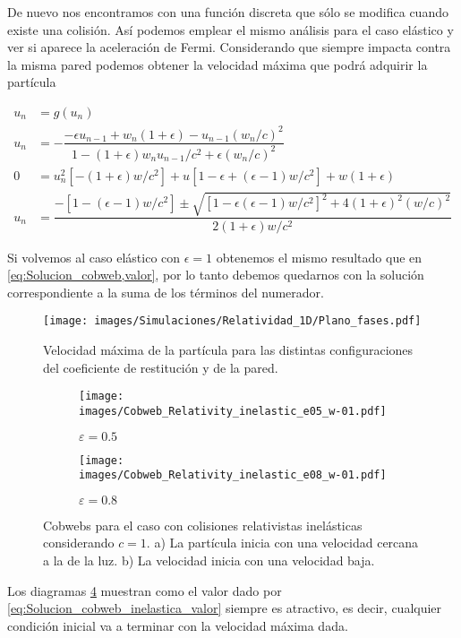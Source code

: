 \documentclass[11pt, spanish]{book}
\begin{document}
De nuevo nos encontramos con una función discreta que sólo se modifica cuando existe una colisión. Así podemos emplear el mismo análisis para el caso elástico y ver si aparece la aceleración de Fermi. Considerando que siempre impacta contra la misma pared podemos obtener la velocidad máxima que podrá adquirir la partícula

\begin{align}\label{eq:Solucion_cobweb_inelastica}
    u_n &= g(u_n) \nonumber\\
    u_n &= -\dfrac{-\epsilon u_{n-1} + w_n(1+\epsilon) -  u_{n-1}(w_n/c)^2}{1 - (1+\epsilon)w_n u_{n-1}/c^2 + \epsilon(w_n/c)^2} \\
    0 &= u_n^2\left[ -(1+\epsilon)w/c^2 \right] + u\left[ 1 - \epsilon + (\epsilon - 1)w/c^2 \right] + w(1+\epsilon) \nonumber\\
    u_n &= \dfrac{-\left[ 1 -  (\epsilon - 1)w/c^2 \right] \pm \sqrt{\left[ 1 - \epsilon (\epsilon - 1)w/c^2 \right]^2 + 4(1+\epsilon)^2(w/c)^2}}{2(1+\epsilon)w/c^2} \label{eq:Solucion_cobweb_inelastica_valor}
\end{align}

Si volvemos al caso elástico con \( \epsilon = 1 \) obtenemos el mismo resultado que en \ref{eq:Solucion_cobweb,valor}, por lo tanto debemos quedarnos con la solución correspondiente a la suma de los términos del numerador. 

\begin{figure}[H]
    \centering
    \texttt{[image: images/Simulaciones/Relatividad\_1D/Plano\_fases.pdf]}
    \caption{Velocidad máxima de la partícula para las distintas configuraciones del coeficiente de restitución y de la pared.}
    \label{fig:plano_fases_coef_wall}
\end{figure}

\begin{figure}[H]
    \centering
    \begin{subfigure}[b]{0.49\textwidth}
        \centering
        \texttt{[image: images/Cobweb\_Relativity\_inelastic\_e05\_w-01.pdf]}
        \caption{$\varepsilon = 0.5$}
        \label{fig:Cobweb_inelastics_A}
    \end{subfigure}
    \hfill
    \begin{subfigure}[b]{0.49\textwidth}
        \centering
        \texttt{[image: images/Cobweb\_Relativity\_inelastic\_e08\_w-01.pdf]}
        \caption{$\varepsilon = 0.8$}
        \label{fig:Cobweb_inelastics_B}
    \end{subfigure}
    \caption{Cobwebs para el caso con colisiones relativistas inelásticas considerando $c=1$. a) La partícula inicia con una velocidad cercana a la de la luz. b) La velocidad inicia con una velocidad baja. }
        \label{fig:Cobweb_inelastics}
\end{figure}

Los diagramas \ref{fig:Cobweb_inelastics} muestran como el valor dado por \ref{eq:Solucion_cobweb_inelastica_valor} siempre es atractivo, es decir, cualquier condición inicial va a terminar con la velocidad máxima dada.
\end{document}

